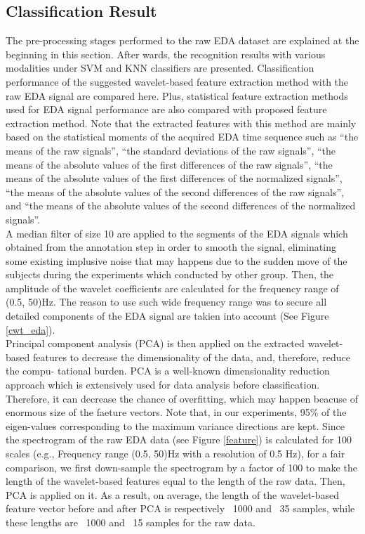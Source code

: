 \subsection{Classification Result}
The pre-processing stages performed to the raw EDA dataset are explained at the beginning in this section.
After wards, the recognition results with various modalities under SVM and KNN classifiers are presented. 
Classification performance of the suggested wavelet-based feature extraction method with the raw EDA signal
are compared here. Plus, statistical feature extraction methods \cite{liu2016human, mera2004emotion} 
used for EDA signal performance are also compared with proposed feature extraction method. Note that the extracted 
features with this method are mainly based on the statistical moments of the acquired EDA time sequence such as 
“the means of the raw signals”, “the standard deviations of the raw signals”, “the means of the absolute values 
of the first differences of the raw signals”, “the means of the absolute values of the first differences of 
the normalized signals”, “the means of the absolute values of the second differences of the raw signals”, 
and “the means of the absolute values of the second differences of the normalized signals”.\\

A median filter of size 10 are applied to the segments of the EDA signals which obtained from the annotation step
in order to smooth the signal, eliminating some existing implusive noise that may happens due to the sudden move
of the subjects during the experiments which conducted by other group. Then, the amplitude of the wavelet 
coefficients are calculated for the frequency range of (0.5, 50)Hz. The reason to use such wide frequency
range was to secure all detailed components of the EDA signal are takien into account (See Figure \ref{cwt_eda}).\\

Principal component analysis (PCA) \cite{abdi2010principal} is then applied on the extracted wavelet-based 
features to decrease the dimensionality of the data, and, therefore, reduce the compu- tational burden. 
PCA is a well-known dimensionality reduction approach which is extensively used for data analysis before 
classification. Therefore, it can decrease the chance of overfitting, which may happen beacuse of  enormous
size of the faeture vectors. Note that, in our experiments, 95\% of the eigen-values corresponding to the 
maximum variance directions are kept. Since the spectrogram of the raw EDA data (see Figure \ref{feature}) is calculated 
for 100 scales (e.g., Frequency range (0.5, 50)Hz with a resolution of 0.5 Hz), for a fair comparison, we 
first down-sample the spectrogram by a factor of 100 to make the length of the wavelet-based features equal 
to the length of the raw data. Then, PCA is applied on it. As a result, on average, the length of the 
wavelet-based feature vector before and after PCA is respectively ~1000 and ~35 samples, while these lengths 
are ~1000 and ~15 samples for the raw data.\\

